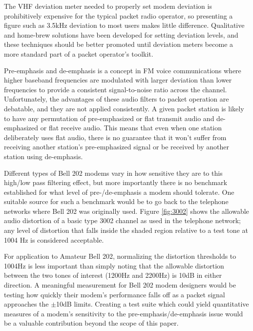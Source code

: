 \documentclass[12pt,letterpaper]{article}
\begin{document}
The VHF deviation meter needed to properly set modem deviation is prohibitively
expensive for the typical packet radio operator, so presenting a figure 
such as 3.5kHz deviation to most users makes little difference.
Qualitative and home-brew solutions have been developed
for setting deviation levels\cite{n8urdev},
and these techniques should be better promoted until 
deviation meters become a more standard part of a packet operator's toolkit. 

Pre-emphasis and de-emphasis is a concept in FM voice communications where
higher baseband frequencies are modulated with larger deviation 
than lower frequencies
to provide a consistent signal-to-noise ratio across the channel.
Unfortunately, the advantages of these audio filters to packet operation 
are debatable, and they are not applied consistently. A given packet 
station is likely to have any permutation of pre-emphasized or flat 
transmit audio and de-emphasized or flat receive audio.
This means that even when one station deliberately uses flat audio,
there is no guarantee that it won't suffer from receiving another
station's pre-emphasized signal or be received by another station using de-emphasis.

Different types of Bell 202 modems vary in how sensitive they are to this high/low
pass filtering effect, but more importantly there is no benchmark established
for what level of pre-/de-emphasis a modem should tolerate.
One suitable source for such a benchmark would be to go back to the
telephone networks where Bell 202 was originally used.
Figure \ref{fig:3002} shows the allowable audio distortion of a basic type 3002
channel as used in the telephone network; any level of distortion that falls 
inside the shaded region relative to a test tone at 1004 Hz is considered acceptable.

For application to Amateur Bell 202, 
normalizing the distortion thresholds to 1004Hz is 
less important than simply noting that the allowable distortion between the two
tones of interest (1200Hz and 2200Hz) is 10dB in either direction.
A meaningful measurement for Bell 202 modem designers would be testing how
quickly their modem's performance falls off as a packet signal approaches 
the $\pm$10dB limits.
Creating a test suite which could yield quantitative
measures of a modem's sensitivity to the pre-emphasis/de-emphasis issue would
be a valuable contribution beyond the scope of this paper.
\end{document}
